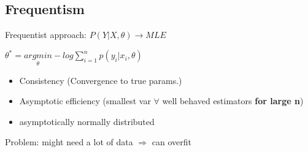 \subsection{Frequentism}

Frequentist approach: $P(Y|X,\theta) \rightarrow MLE$

$\theta^* = \underset{\theta}{argmin} -log\sum_{i=1}^np(y_i|x_i,\theta)$

\begin{itemize}
    \item Consistency (Convergence to true params.)
    \item Asymptotic efficiency (smallest var $\forall$ well behaved estimators \textbf{for large n})
    \item asymptotically normally distributed
\end{itemize}

Problem: might need a lot of data $\Rightarrow$ can overfit %